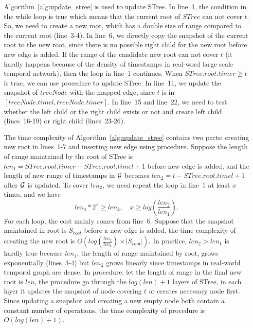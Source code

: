 \documentclass[10pt,journal,compsoc]{IEEEtran}
\begin{document}
Algorithm~\ref{alg:update_stree} is used to update STree. In line~1, the condition in the while loop is true which means that the current root of $ STree $ can not cover $ t $. So, we need to create a new root, which has a double size of range compared to the current root (line~3-4). In line~6, we directly copy the snapshot of the current root to the new root, since there is no possible right child for the new root before new edge is added. If the range of the candidate new root can not cover $ t $ (it hardly happens because of the density of timestamps in real-word large scale temporal network), then the loop in line~1 continues. When $ STree.root.timer \geq t $ is true, we can use  procedure to update STree. In line~11, we update the snapshot of $ treeNode $ with the mapped edge, since $ t $ is in $ [treeNode.timel,treeNode.timer] $. In line~15 and line~22, we need to test whether the left child or the right child exists or not and create left child (lines~16-19) or right child (lines~23-26). %

The time complexity of Algorithm~\ref{alg:update_stree} contains two parts: creating new root in lines~1-7 and inserting new edge using  procedure. Suppose the length of range maintained by the root of STree is $ len_1=STree.root.timer-STree.root.timel+1 $ before new edge is added, and the length of new range of timestamps in $ \mathcal{G} $ becomes $ len_2=t-STree.root.timel+1 $ after $ \mathcal{G} $ is updated. To cover $ len_2 $, we need repeat the loop in line~1 at least $ x $ times, and we have
\begin{equation}
	\label{eqt:new_root_create_times}
		len_1*2^x \geq len_2, \quad
		x \geq log(\frac{len_2}{len_1}).
\end{equation}
For each loop, the cost mainly comes from line~6. Suppose that the snapshot maintained in root is $ S_{root} $ before a new edge is added, the time complexity of creating the new root is $ O(log(\frac{len_2}{len_1})\times |S_{root}|) $. In practice, $ len_2>len_1 $ is hardly true because $ len_1 $, the length of range maintained by root, grows exponentially (lines~3-4) but $ len_2 $ grows linearly since timestamps in real-world temporal graph are dense. In  procedure, let the length of range in the final new root is $ len $, the procedure go through the $ log(len)+1 $ layers of STree, in each layer it updates the snapshot of node covering $ t $ or creates necessary node first. Since updating a snapshot and creating a new empty node both contain a constant number of operations, the time complexity of  procedure is $ O(log(len)+1) $.
\end{document}
